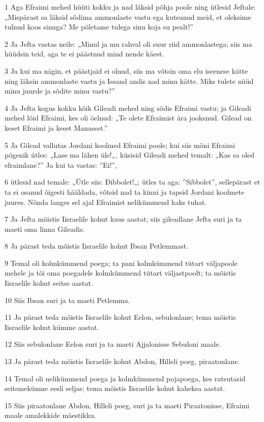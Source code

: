 \par 1 Aga Efraimi mehed hüüti kokku ja nad läksid põhja poole ning ütlesid Jeftale: „Mispärast sa läksid sõdima ammonlaste vastu ega kutsunud meid, et oleksime tulnud koos sinuga? Me põletame tulega sinu koja su pealt!”
\par 2 Ja Jefta vastas neile: „Minul ja mu rahval oli suur riid ammonlastega; siis ma hüüdsin teid, aga te ei päästnud mind nende käest.
\par 3 Ja kui ma nägin, et päästjaid ei olnud, siis ma võtsin oma elu iseenese kätte ning läksin ammonlaste vastu ja Issand andis nad minu kätte. Miks tulete nüüd minu juurde ja sõdite minu vastu?”
\par 4 Ja Jefta kogus kokku kõik Gileadi mehed ning sõdis Efraimi vastu; ja Gileadi mehed lõid Efraimi, kes oli öelnud: „Te olete Efraimist ära jooksnud. Gilead on keset Efraimi ja keset Manasset.”
\par 5 Ja Gilead vallutas Jordani koolmed Efraimi poole; kui siis mõni Efraimi põgenik ütles: „Lase ma lähen üle!„, küsisid Gileadi mehed temalt: „Kas sa oled efraimlane?” Ja kui ta vastas: ”Ei!”,
\par 6 ütlesid nad temale: „Ütle siis: Ðibbolet!„; ütles ta aga: ”Sibbolet”, sellepärast et ta ei osanud õigesti hääldada, võtsid nad ta kinni ja tapsid Jordani koolmete juures. Nõnda langes sel ajal Efraimist nelikümmend kaks tuhat.
\par 7 Ja Jefta mõistis Iisraelile kohut kuus aastat; siis gileadlane Jefta suri ja ta maeti oma linna Gileadis.
\par 8 Ja pärast teda mõistis Iisraelile kohut Ibsan Petlemmast.
\par 9 Temal oli kolmkümmend poega; ta pani kolmkümmend tütart väljapoole mehele ja tõi oma poegadele kolmkümmend tütart väljastpoolt; ta mõistis Iisraelile kohut seitse aastat.
\par 10 Siis Ibsan suri ja ta maeti Petlemma.
\par 11 Ja pärast teda mõistis Iisraelile kohut Eelon, sebulonlane; tema mõistis Iisraelile kohut kümme aastat.
\par 12 Siis sebulonlane Eelon suri ja ta maeti Ajjalonisse Sebuloni maale.
\par 13 Ja pärast teda mõistis Iisraelile kohut Abdon, Hilleli poeg, piraatonlane.
\par 14 Temal oli nelikümmend poega ja kolmkümmend pojapoega, kes ratsutasid seitsmekümne eesli seljas; tema mõistis Iisraelile kohut kaheksa aastat.
\par 15 Siis piraatonlane Abdon, Hilleli poeg, suri ja ta maeti Piraatonisse, Efraimi maale amalekkide mäestikku.

